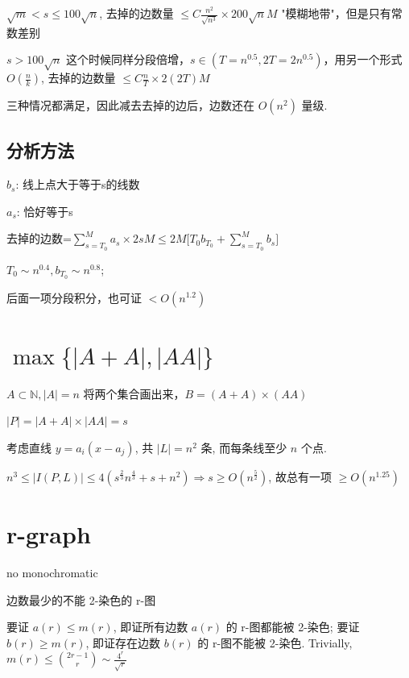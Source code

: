 $\sqrt{m}<s\leq100\sqrt{n}$, 去掉的边数量 $\leq C\frac{n^2}{\sqrt{n^3}}\times200\sqrt{n}M$ "模糊地带"，但是只有常数差别

$s>100\sqrt{n}$ 这个时候同样分段倍增，$s\in(T=n^{0.5},2T=2n^{0.5})$，用另一个形式 $O(\frac{n}{k})$, 去掉的边数量 $\leq C\frac{n}{T}\times 2(2T)M$


三种情况都满足，因此减去去掉的边后，边数还在 $O(n^2)$ 量级.

\subsection{分析方法}

$b_s$: 线上点大于等于s的线数

$a_s$: 恰好等于s

去掉的边数=$\sum_{s=T_0}^{M}{a_s\times 2sM}\leq2M\big[T_0b_{T_0}+\sum_{s=T_0}^{M}b_s\big]$

$T_0\sim n^{0.4}, b_{T_0}\sim n^{0.8}$;

后面一项分段积分，也可证 $<O(n^{1.2})$

\section{$\max\{|A+A|,|AA|\}$}

$A\subset\mathbb{N}, |A|=n$ 将两个集合画出来，$B=(A+A)\times(AA)$

$|P|=|A+A|\times|AA|=s$

考虑直线 $y=a_i(x-a_j)$, 共 $|L|=n^2$ 条, 而每条线至少 $n$ 个点.

$n^3\leq|I(P,L)|\leq4(s^{\frac{2}{3}}n^{\frac{4}{3}}+s+n^2)\Rightarrow s\geq O(n^\frac{5}{2})$, 故总有一项 $\geq O(n^{1.25})$

\section{r-graph}


no monochromatic


边数最少的不能 2-染色的 r-图

要证 $a(r)\leq m(r)$, 即证所有边数 $a(r)$ 的 r-图都能被 2-染色; 要证 $b(r)\geq m(r)$, 即证存在边数 $b(r)$ 的 r-图不能被 2-染色. Trivially, $m(r)\leq{2r-1\choose r}\sim\frac{4^r}{\sqrt{r}}$
